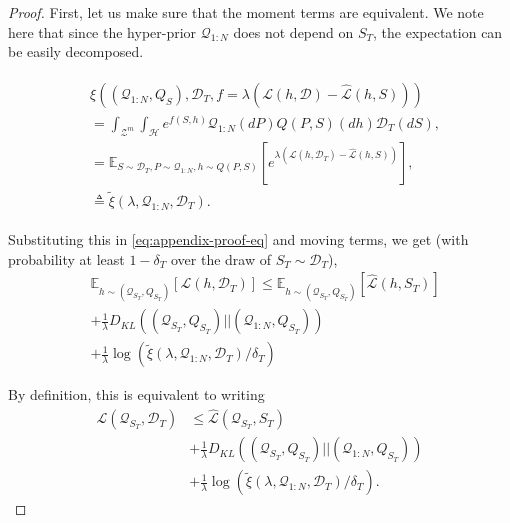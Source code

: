 \documentclass[letterpaper]{article} %
\theoremstyle{definition}
\newcommand{\Expect}[2]{\mathbb{E}_{#1}\left [#2 \right ]}
\begin{document}
\begin{proof}
	First, let us make sure that the moment terms are equivalent. We note here that since the hyper-prior $\mathcal{Q}_{1:N}$ does not depend on $S_T$, the expectation can be easily decomposed.
	
	\begin{align*}
	\begin{split}
		&\xi\left ((\mathcal{Q}_{1:N}, Q_S), \mathcal{D}_T, f=\lambda(\mathcal{L}(h,\mathcal{D})-\hat{\mathcal{L}}(h,S))\right )\\
		&=\int_{\mathcal{Z}^m}\int_{\mathcal{H}}e^{f(S,h)}\mathcal{Q}_{1:N}(dP)Q(P,S)(dh)\mathcal{D}_T(dS) ,\\
		&=\Expect{S\sim \mathcal{D}_T, P\sim \mathcal{Q}_{1:N}, h\sim Q(P,S)}{e^{\lambda\left (\mathcal{L}(h, \mathcal{D}_T)-\hat{\mathcal{L}}(h, S)\right )}} ,\\
		&\triangleq \tilde{\xi}(\lambda,\mathcal{Q}_{1:N},\mathcal{D}_T) .
	\end{split}
	\end{align*}
	
	Substituting this in \eqref{eq:appendix-proof-eq} and moving terms, we get (with probability at least $1-\delta_T$ over the draw of $S_T\sim \mathcal{D}_T$),
	\begin{equation} 
	\begin{split}
	&\Expect{h\sim (\mathcal{Q}_{S_T}, Q_{S_T})}{\mathcal{L}(h,\mathcal{D}_T)} \leq \Expect{h\sim (\mathcal{Q}_{S_T}, Q_{S_T})}{\hat{\mathcal{L}}(h,S_T)}\\
	&+\frac{1}{\lambda} D_{KL}((\mathcal{Q}_{S_T}, Q_{S_T})||(\mathcal{Q}_{1:N}, Q_{S_T}))\\
	&+\frac{1}{\lambda}\log\left (\tilde{\xi}(\lambda,\mathcal{Q}_{1:N},\mathcal{D}_T)/\delta_T\right )
	\end{split}
	\end{equation}
	
	By definition, this is equivalent to writing
%	
	\begin{equation} \label{eq:appendix-proof-eq-2}
	\begin{split}
	\mathcal{L}(\mathcal{Q}_{S_T},\mathcal{D}_T) &\leq \hat{\mathcal{L}}(\mathcal{Q}_{S_T},S_T)\\ &+\frac{1}{\lambda} D_{KL}((\mathcal{Q}_{S_T}, Q_{S_T})||(\mathcal{Q}_{1:N}, Q_{S_T})) \\
	&+\frac{1}{\lambda}\log\left (\tilde{\xi}(\lambda,\mathcal{Q}_{1:N},\mathcal{D}_T)/\delta_T\right ) .
	\end{split}
	\end{equation}
	

\end{proof}
\end{document}
